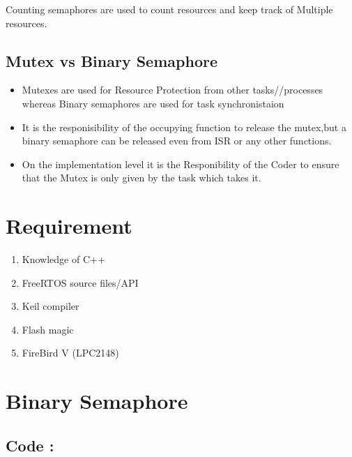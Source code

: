 \documentclass[11pt,a4paper]{article}
\begin{document}
	Counting semaphores are used to count resources and keep track of Multiple resources.
	\\
	\newpage 
	\subsection{Mutex vs Binary Semaphore}
	\begin{itemize}
		\item Mutexes are used for Resource Protection from other tasks//processes whereas Binary semaphores are used for task synchronistaion
		\\
		\item It is the responisibility of the occupying function to release the mutex,but a binary semaphore can be released even from ISR or any other functions.
		\\
		\item On the implementation level it is the Responibility of the Coder to ensure that the Mutex is only given by the task which takes it.
		
	\end{itemize}
		
	\section{Requirement}
	\begin{enumerate}
		\item Knowledge of C++ 
		\item FreeRTOS source files/API
		\item Keil compiler
		\item Flash magic
		\item FireBird V (LPC2148)
	\end{enumerate}
	
	
	
	
	\newpage	
	\section{Binary Semaphore}
	
\subsection{Code : }
		
	\newpage
\end{document}
